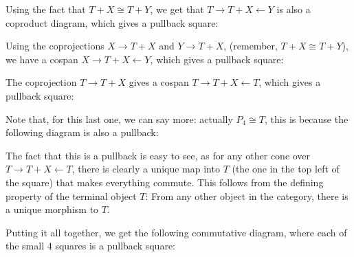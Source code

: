 \documentclass{article}
\begin{document}
Using the fact that $T+X \cong T+Y$, we get that $T \rightarrow T+X \leftarrow Y$ is also a coproduct diagram, which gives a pullback square:

\begin{center}\end{center}

Using the coprojections $X \to T+X$ and $Y \to T+X$, (remember, $T+X \cong T+Y$), we have a cospan $X \rightarrow T+X \leftarrow Y$, which gives a pullback square:

\begin{center}\end{center}

The coprojection $T \to T+X$  gives a cospan $T \rightarrow T+X \leftarrow T$, which gives a pullback square:

\begin{center}\end{center}

Note that, for this last one, we can say more: actually $P_4 \cong T$, this is because the following diagram is also a pullback:

\begin{center}\end{center}

The fact that this is a pullback is easy to see, as  for any other cone over $T \rightarrow T+X \leftarrow T$, there is clearly a unique map into $T$ (the one in the top left of the square) that makes everything commute. This follows from the defining property of the terminal object $T$: From any other object in the category, there is a unique morphism to $T$.


Putting it all together, we  get the following commutative diagram, where each of the small 4 squares is a pullback square:
\end{document}
